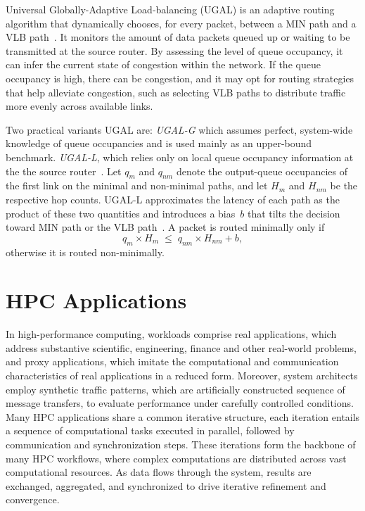 Universal Globally-Adaptive Load-balancing (UGAL) is an adaptive routing algorithm that dynamically chooses, for every packet,
between a MIN path and a VLB path~\cite{kim2008technology}. It monitors the amount of data packets queued up or waiting to be transmitted at the source router. By assessing the level of queue occupancy, it can infer the current state of congestion within the network. If the queue occupancy is high, there can be congestion, and it may opt for routing strategies that help alleviate congestion, such as selecting VLB paths to distribute traffic more evenly across available links. 

Two practical variants UGAL are:
\emph{UGAL-G} which assumes perfect, system-wide knowledge of queue occupancies and is
used mainly as an upper-bound benchmark.
\emph{UGAL-L}, which relies only on local queue occupancy information at the the source
router~\cite{kim2008technology}.  
Let $q_m$ and $q_{nm}$ denote the output-queue occupancies of the first link on
the minimal and non-minimal paths, and let $H_m$ and $H_{nm}$ be the respective
hop counts.  
UGAL-L approximates the latency of each path as the product of these two
quantities and introduces a bias~$b$ that tilts the decision toward MIN path or
the VLB path~\cite{kim2008technology}.  
A packet is routed minimally only if
\[
  q_m \times H_m \;\le\; q_{nm} \times H_{nm} + b,
\]
otherwise it is routed non-minimally.  



\section{HPC Applications}
\label{sec:exp}
In high-performance computing, workloads comprise real applications, which address substantive scientific, engineering, finance and other real-world problems, and proxy applications, which imitate the computational and communication characteristics of real applications in a reduced form. Moreover, system architects employ synthetic traffic patterns, which are artificially constructed sequence of message transfers, to evaluate performance under carefully controlled conditions.
Many HPC applications share a common iterative structure, each iteration entails a sequence of computational tasks executed in parallel, followed by communication and synchronization steps. These iterations form the backbone of many HPC workflows, where complex computations are distributed across vast computational resources. As data flows through the system, results are exchanged, aggregated, and synchronized to drive iterative refinement and convergence.

